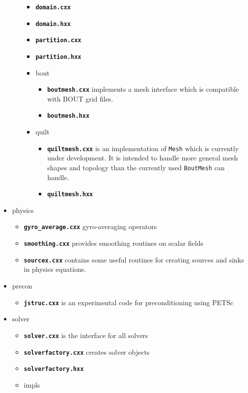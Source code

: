 \documentclass[12pt]{article}
\newcommand{\code}[1]{\texttt{#1}}
\newcommand{\file}[1]{\texttt{\bf #1}}
\begin{document}
\begin{itemize}
\begin{itemize}
    \begin{itemize}
    \item \file{domain.cxx}
    \item \file{domain.hxx}
    \item \file{partition.cxx}
    \item \file{partition.hxx}
    \item bout
      \begin{itemize}
      \item \file{boutmesh.cxx} implements a mesh interface which is compatible
	with BOUT grid files.
      \item \file{boutmesh.hxx}
      \end{itemize}
    \item quilt
      \begin{itemize}
      \item \file{quiltmesh.cxx} is an implementation of \code{Mesh} which is
	currently under development. It is intended to handle more general mesh
	shapes and topology than the currently used \code{BoutMesh} can handle.
      \item \file{quiltmesh.hxx}
      \end{itemize}
    \end{itemize}
  \end{itemize}
\item physics
  \begin{itemize}
  \item \file{gyro\_average.cxx} gyro-averaging operators
  \item \file{smoothing.cxx} provides smoothing routines on scalar fields
  \item \file{sourcex.cxx} contains some useful routines for creating
    sources and sinks in physics equations.
  \end{itemize}
\item precon
  \begin{itemize}
  \item \file{jstruc.cxx} is an experimental code for preconditioning using
    PETSc
  \end{itemize}
\item solver
  \begin{itemize}
  \item \file{solver.cxx} is the interface for all solvers 
  \item \file{solverfactory.cxx} creates solver objects
  \item \file{solverfactory.hxx}
  \item impls

\end{itemize}
\end{itemize}
\end{document}
